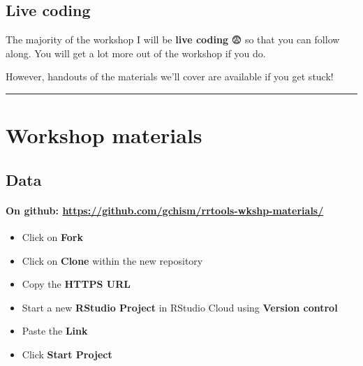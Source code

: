 \documentclass[
  letterpaper,
  DIV=11,
  numbers=noendperiod]{scrreprt}
\begin{document}
\hypertarget{live-coding}{%
\section*{Live coding}\label{live-coding}}

The majority of the workshop I will be \textbf{live coding} 😨 so that
you can follow along. You will get a lot more out of the workshop if you
do.

However, handouts of the materials we'll cover are available if you get
stuck!

\begin{center}\rule{0.5\linewidth}{0.5pt}\end{center}


\hypertarget{workshop-materials}{%
\chapter*{Workshop materials}\label{workshop-materials}}

\hypertarget{data}{%
\section*{Data}\label{data}}

\hypertarget{on-github-httpsgithub.comgchismrrtools-wkshp-materials}{%
\subsubsection*{\texorpdfstring{On github:
\href{https://github.com/Gchism94/rrtools-repro-research}{https://github.com/gchism/rrtools-wkshp-materials/}}{On github: https://github.com/gchism/rrtools-wkshp-materials/}}\label{on-github-httpsgithub.comgchismrrtools-wkshp-materials}}

\begin{itemize}
\item
  Click on \textbf{Fork}
\item
  Click on \textbf{Clone} within the new repository
\item
  Copy the \textbf{HTTPS URL}
\item
  Start a new \textbf{RStudio Project} in RStudio Cloud using
  \textbf{Version control}
\item
  Paste the \textbf{Link}
\item
  Click \textbf{Start Project}
\end{itemize}
\end{document}
